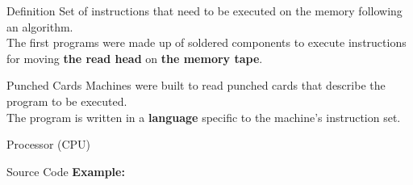 \begin{frame}{Definition}
    Set of instructions that need to be executed on the memory following an algorithm. \\
    \newline
    The first programs were made up of soldered components to execute instructions for moving \textbf{the read head} on \textbf{the memory tape}.
\end{frame}

\begin{frame}{Punched Cards}
    Machines were built to read punched cards that describe the program to be executed. \\
    The program is written in a \textbf{language} specific to the machine's instruction set.
\end{frame}

\begin{frame}{Processor (CPU)}
\end{frame}

\begin{frame}{Source Code}
    \textbf{Example:}
\end{frame}